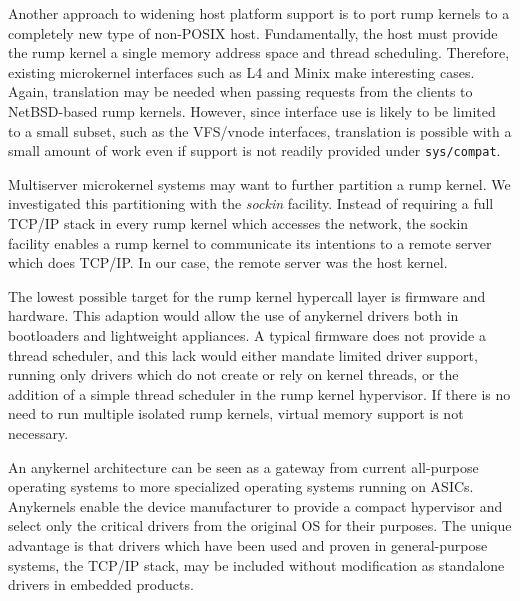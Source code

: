 Another approach to widening host platform support is to port rump
kernels to a completely new type of non-POSIX host.  Fundamentally,
the host must provide the rump kernel a single memory address space and
thread scheduling.  Therefore, existing microkernel interfaces such as L4
and Minix make interesting cases.  Again, translation may be needed when
passing requests from the clients to NetBSD-based rump kernels.  However,
since interface use is likely to be limited to a small subset, such as
the VFS/vnode interfaces, translation is possible with a small amount
of work even if support is not readily provided under \texttt{sys/compat}.

Multiserver microkernel systems may want to further partition a rump
kernel.  We investigated this partitioning with the \textit{sockin}
facility.  Instead of requiring a full TCP/IP stack in every rump kernel
which accesses the network, the sockin facility enables a rump kernel
to communicate its intentions to a remote server which does TCP/IP.
In our case, the remote server was the host kernel.

The lowest possible target for the rump kernel hypercall layer is firmware
and hardware.  This adaption would allow the use of anykernel drivers both
in bootloaders and lightweight appliances.  A typical firmware does not
provide a thread scheduler, and this lack would either mandate limited
driver support, \ie running only drivers which do not create or rely
on kernel threads, or the addition of a simple thread scheduler in the
rump kernel hypervisor.  If there is no need to run multiple isolated
rump kernels, virtual memory support is not necessary.

An anykernel architecture can be seen as a gateway from
current all-purpose operating systems to more specialized operating
systems running on ASICs.  Anykernels enable the
device manufacturer to provide a compact hypervisor and select only
the critical drivers from the original OS for their purposes.  The
unique advantage is that drivers which have been used and proven
in general-purpose systems, \eg the TCP/IP stack, may be included
without modification as standalone drivers in embedded products.
